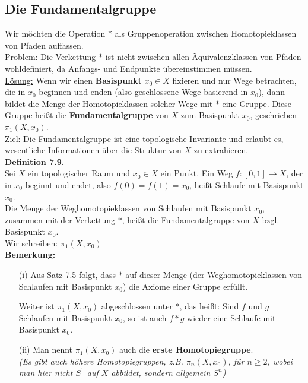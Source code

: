 \documentclass[fleqn, 12pt, letterpaper]{article}
\begin{document}
\subsection{Die Fundamentalgruppe}

Wir möchten die Operation \( * \) als Gruppenoperation zwischen Homotopieklassen von Pfaden auffassen.\\

\underline{Problem:} Die Verkettung \( * \) ist nicht zwischen allen Äquivalenzklassen von Pfaden wohldefiniert, da Anfangs- und Endpunkte übereinstimmen müssen.\\

\underline{Lösung:} Wenn wir einen \textbf{Basispunkt} \( x_0 \in X \) fixieren und nur Wege betrachten, die in \( x_0 \) beginnen und enden (also geschlossene Wege basierend in \( x_0 \)), dann bildet die Menge der Homotopieklassen solcher Wege mit \( * \) eine Gruppe. Diese Gruppe heißt die \textbf{Fundamentalgruppe} von \( X \) zum Basispunkt \( x_0 \), geschrieben \( \pi_1(X, x_0) \).\\

\underline{Ziel:} Die Fundamentalgruppe ist eine topologische Invariante und erlaubt es, wesentliche Informationen über die Struktur von \( X \) zu extrahieren.\\

\textbf{Definition 7.9.} \\
Sei \( X \) ein topologischer Raum und \( x_0 \in X \) ein Punkt.
Ein {Weg} \( f : [0,1] \to X \), der in \( x_0 \) beginnt und endet, also \( f(0) = f(1) = x_0 \), heißt \underline{Schlaufe} mit Basispunkt \( x_0 \).\\

Die Menge der Weghomotopieklassen von Schlaufen mit Basispunkt \( x_0 \), zusammen mit der Verkettung \( * \), heißt die \underline{Fundamentalgruppe} von \( X \) bzgl. Basispunkt \( x_0 \). \\

Wir schreiben:
\(\pi_1(X, x_0)\) \\

\textbf{Bemerkung:}
\begin{enumerate}
  \item[(i)]  Aus Satz 7.5 folgt, dass \( * \) auf dieser Menge (der Weghomotopieklassen von Schlaufen mit Basispunkt \( x_0 \)) die Axiome einer Gruppe erfüllt.

  Weiter ist \( \pi_1(X, x_0) \) abgeschlossen unter \( * \), das heißt: Sind \( f \) und \( g \) Schlaufen mit Basispunkt \( x_0 \), 
  so ist auch \( f * g \) wieder eine Schlaufe mit Basispunkt \( x_0 \).

  \item[(ii)] Man nennt \( \pi_1(X, x_0) \) auch die \textbf{erste Homotopiegruppe}.\\
  \textit{(Es gibt auch höhere Homotopiegruppen, z.B. \( \pi_n(X, x_0) \), für \( n \geq 2 \), wobei man hier nicht $S^1$ auf $X$ abbildet, sondern allgemein $S^n$)}
\end{enumerate}
\end{document}
